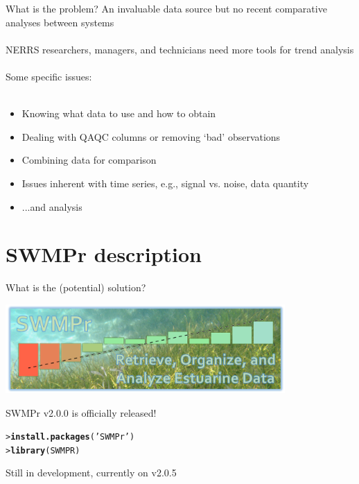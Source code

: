 \documentclass[serif]{beamer}\usepackage[]{graphicx}\usepackage[]{color}
\makeatletter
\newcommand{\hlstr}[1]{\textcolor[rgb]{0.192,0.494,0.8}{#1}}%
\newcommand{\hlstd}[1]{\textcolor[rgb]{0.345,0.345,0.345}{#1}}%
\newcommand{\hlkwd}[1]{\textcolor[rgb]{0.737,0.353,0.396}{\textbf{#1}}}%
\newenvironment{kframe}{%
 \def\at@end@of@kframe{}%
 \ifinner\ifhmode%
  \def\at@end@of@kframe{\end{minipage}}%
  \begin{minipage}{\columnwidth}%
 \fi\fi%
 \def\FrameCommand##1{\hskip\@totalleftmargin \hskip-\fboxsep
 \colorbox{shadecolor}{##1}\hskip-\fboxsep
     \hskip-\linewidth \hskip-\@totalleftmargin \hskip\columnwidth}%
 \MakeFramed {\advance\hsize-\width
   \@totalleftmargin\z@ \linewidth\hsize
   \@setminipage}}%
 {\par\unskip\endMakeFramed%
 \at@end@of@kframe}
\newenvironment{knitrout}{}{} %
\makeatother
\begin{document}
\begin{frame}{What is the problem?}
An invaluable data source but no recent comparative analyses between systems \\~\\
NERRS researchers, managers, and technicians need more tools for trend analysis \\~\\
Some specific issues:\\~\\
\begin{itemize}
\item Knowing what data to use and how to obtain
\item Dealing with QAQC columns or removing `bad' observations
\item Combining data for comparison
\item Issues inherent with time series, e.g., signal vs. noise, data quantity
\item ...and analysis
\end{itemize}
\end{frame}

\section{SWMPr description}

\begin{frame}[fragile]{What is the (potential) solution?}
\centerline{\includegraphics[width = 0.8\textwidth]{fig/swmpr_logo.png}}
\vspace{0.15in}
SWMPr v2.0.0 is officially released!
\begin{knitrout}
\color{fgcolor}\begin{kframe}
\begin{alltt}
\hlstd{> }\hlkwd{install.packages}\hlstd{(}\hlstr{'SWMPr'}\hlstd{)}
\hlstd{> }\hlkwd{library}\hlstd{(SWMPR)}
\end{alltt}
\end{kframe}
\end{knitrout}
Still in development, currently on v2.0.5
\end{frame}
\end{document}
